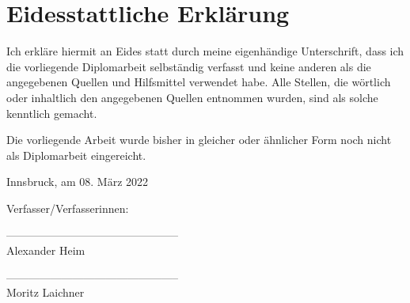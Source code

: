 \section*{Eidesstattliche Erklärung}

Ich erkläre hiermit an Eides statt durch meine eigenhändige Unterschrift, dass ich die vorliegende Diplomarbeit selbständig verfasst und keine anderen als die angegebenen Quellen und Hilfsmittel verwendet habe. Alle Stellen, die wörtlich oder inhaltlich den angegebenen Quellen entnommen wurden, sind als solche kenntlich gemacht.

Die vorliegende Arbeit wurde bisher in gleicher oder ähnlicher Form noch nicht als Diplomarbeit eingereicht.

Innsbruck, am 08. März 2022

\vspace*{3cm}



Verfasser/Verfasserinnen:

\vspace*{2cm}


-----------------------------------------------\\
\hspace*{1.3cm}           Alexander Heim

\vspace*{2cm}


-----------------------------------------------\\
\hspace*{1.3cm}           Moritz Laichner



\newpage